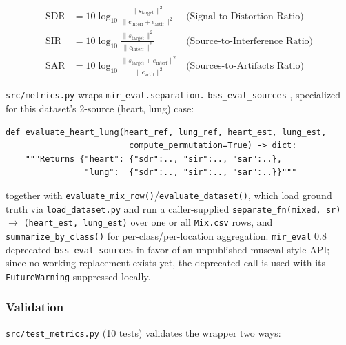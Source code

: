 \documentclass[11pt]{article}
\begin{document}
\begin{align}
\text{SDR} &= 10\log_{10}\frac{\lVert s_{\text{target}} \rVert^2}
  {\lVert e_{\text{interf}} + e_{\text{artif}} \rVert^2}
  & \text{(Signal-to-Distortion Ratio)} \\
\text{SIR} &= 10\log_{10}\frac{\lVert s_{\text{target}} \rVert^2}
  {\lVert e_{\text{interf}} \rVert^2}
  & \text{(Source-to-Interference Ratio)} \\
\text{SAR} &= 10\log_{10}\frac{\lVert s_{\text{target}} + e_{\text{interf}} \rVert^2}
  {\lVert e_{\text{artif}} \rVert^2}
  & \text{(Sources-to-Artifacts Ratio)}
\end{align}

\texttt{src/metrics.py} wraps \texttt{mir\_eval.separation.}
\texttt{bss\_eval\_sources} \cite{mireval}, specialized for this dataset's
2-source (heart, lung) case:

\begin{lstlisting}
def evaluate_heart_lung(heart_ref, lung_ref, heart_est, lung_est,
                         compute_permutation=True) -> dict:
    """Returns {"heart": {"sdr":.., "sir":.., "sar":..},
                "lung":  {"sdr":.., "sir":.., "sar":..}}"""
\end{lstlisting}

together with \texttt{evaluate\_mix\_row()}/\texttt{evaluate\_dataset()},
which load ground truth via \texttt{load\_dataset.py} and run a
caller-supplied \texttt{separate\_fn(mixed, sr)} $\to$
\texttt{(heart\_est, lung\_est)} over one or all \texttt{Mix.csv} rows, and
\texttt{summarize\_by\_class()} for per-class/per-location aggregation.
\texttt{mir\_eval} 0.8 deprecated \texttt{bss\_eval\_sources} in favor of an
unpublished museval-style API; since no working replacement exists yet, the
deprecated call is used with its \texttt{FutureWarning} suppressed locally.

\subsubsection{Validation}
\label{sec:validation}

\texttt{src/test\_metrics.py} (10 tests) validates the wrapper two ways:
\end{document}

